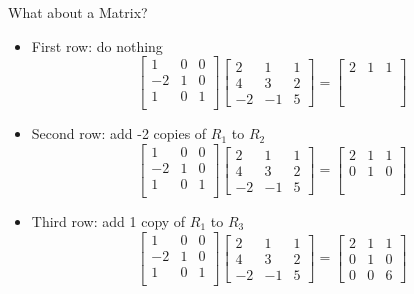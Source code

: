 \documentclass[10pt]{beamer}
\begin{document}
\begin{frame}[shrink]{What about a Matrix?}
\begin{itemize}
    \item First row: do nothing
        \[
        \begin{bmatrix}
          1 & 0 & 0\\
        -2 & 1 & 0\\
        1 & 0 & 1\\
        \end{bmatrix}
         \begin{bmatrix}2 &1&1\\ 4 &3&2\\ -2 &-1&5\end{bmatrix}  =
        \begin{bmatrix}
        2 & 1 & 1\\ \phantom0 &\phantom1 & \phantom1\\ \phantom0&\phantom0&\phantom6
        \end{bmatrix}
        \]
          \item<2-> Second row: add -2 copies of $R_1$ to $R_2$
        \[
        \begin{bmatrix}
          1 & 0 & 0\\
        -2 & 1 & 0\\
        1 & 0 & 1\\
        \end{bmatrix}
         \begin{bmatrix}2 &1&1\\ 4 &3&2\\ -2 &-1&5\end{bmatrix}  =
        \begin{bmatrix}
        2 &1 & 1\\ 0 &1 & 0\\ \phantom0&\phantom0&\phantom6
        \end{bmatrix}
        \]
             \item<3-> Third row: add 1 copy of $R_1$ to $R_3$
        \[
        \begin{bmatrix}
          1 & 0 & 0\\
        -2 & 1 & 0\\
        1 & 0 & 1\\
        \end{bmatrix}
         \begin{bmatrix}2 &1&1\\ 4 &3&2\\ -2 &-1&5\end{bmatrix}  =
        \begin{bmatrix}
        2 &1 & 1\\ 0 &1 & 0\\ 0&0&6
        \end{bmatrix}
        \]
\end{itemize}
\end{frame}
\end{document}
